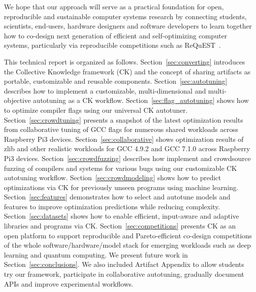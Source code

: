 We hope that our approach will serve as a practical foundation
for open, reproducible and sustainable computer systems research
by connecting students, scientists, end-users, hardware designers
and software developers to learn together how to co-design
next generation of efficient and self-optimizing computer systems,
particularly via reproducible competitions such as ReQuEST~\cite{request}.
%

This technical report is organized as follows.
%
Section~\ref{sec:converting} introduces the Collective Knowledge framework (CK)
and the concept of sharing artifacts as portable, customizable and reusable components.
%
Section~\ref{sec:autotuning} describes how to implement a customizable,
multi-dimensional and multi-objective autotuning as a CK workflow.
%
Section~\ref{sec:flag_autotuning} shows how to optimize compiler flags using
our universal CK autotuner.
%
Section~\ref{sec:crowdtuning} presents a snapshot of the latest optimization
results from collaborative tuning of GCC flags for numerous shared workloads
across Raspberry Pi3 devices.
%
Section~\ref{sec:collaborative} shows optimization results of zlib and other
realistic workloads for GCC 4.9.2 and GCC 7.1.0 across Raspberry Pi3 devices.
%
Section~\ref{sec:crowdfuzzing} describes how implement and crowdsource fuzzing
of compilers and systems for various bugs using our customizable CK autotuning workflow.
%
Section~\ref{sec:crowdmodeling} shows how to predict optimizations via CK for previously
unseen programs using machine learning.
%
Section~\ref{sec:features} demonstrates how to select and autotune models
and features to improve optimization predictions while reducing complexity.
%
Section~\ref{sec:datasets} shows how to enable efficient, input-aware and adaptive 
libraries and programs via CK.
%
Section~\ref{sec:competitions} presents CK as an open platform to 
support reproducible and Pareto-efficient co-design competitions 
of the whole software/hardware/model stack for emerging workloads 
such as deep learning and quantum computing.
%
We present future work in Section~\ref{sec:conclusions}.
%
We also included Artifact Appendix to allow students try our framework, 
participate in collaborative autotuning, gradually document APIs and
improve experimental workflows.

